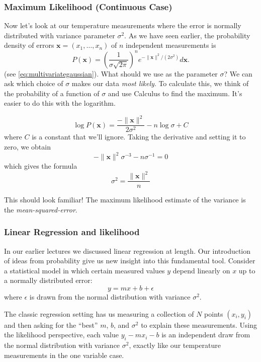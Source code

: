 \documentclass[
]{article}
\begin{document}
\hypertarget{maximum-likelihood-continuous-case}{%
\subsubsection{Maximum Likelihood (Continuous
Case)}\label{maximum-likelihood-continuous-case}}

Now let's look at our temperature measurements where the error is
normally distributed with variance parameter \(\sigma^2\). As we have
seen earlier, the probability density of errors
\(\mathbf{x}=(x_1,\ldots,x_n)\) of \(n\) independent measurements is \[
P(\mathbf{x}) = \left(\frac{1}{\sigma\sqrt{2\pi}}\right)^{n}e^{-\|\mathbf{x}\|^2/(2\sigma^2)}d\mathbf{x}.
\] (see \cref{eq:multivariategaussian}). What should we use as the
parameter \(\sigma\)? We can ask which choice of \(\sigma\) makes our
data \emph{most likely}. To calculate this, we think of the probability
of a function of \(\sigma\) and use Calculus to find the maximum. It's
easier to do this with the logarithm.

\[
\log P(\mathbf{x})=\frac{-\|\mathbf{x}\|^2}{2\sigma^2}-n\log{\sigma}+C
\] where \(C\) is a constant that we'll ignore. Taking the derivative
and setting it to zero, we obtain \[
-\|\mathbf{x}\|^2\sigma^{-3}-n\sigma^{-1}=0
\] which gives the formula \[
\sigma^2=\frac{\|\mathbf{x}\|^2}{n}
\]

This should look familiar! The maximum likelihood estimate of the
variance is the \emph{mean-squared-error}.

\hypertarget{linear-regression-and-likelihood}{%
\subsubsection{Linear Regression and
likelihood}\label{linear-regression-and-likelihood}}

In our earlier lectures we discussed linear regression at length. Our
introduction of ideas from probability give us new insight into this
fundamental tool. Consider a statistical model in which certain measured
values \(y\) depend linearly on \(x\) up to a normally distributed
error: \[
y=mx+b+\epsilon
\] where \(\epsilon\) is drawn from the normal distribution with
variance \(\sigma^2\).

The classic regression setting has us measuring a collection of \(N\)
points \((x_i,y_i)\) and then asking for the ``best'' \(m\), \(b\), and
\(\sigma^2\) to explain these measurements. Using the likelihood
perspective, each value \(y_i-mx_i-b\) is an independent draw from the
normal distribution with variance \(\sigma^2\), exactly like our
temperature measurements in the one variable case.
\end{document}
